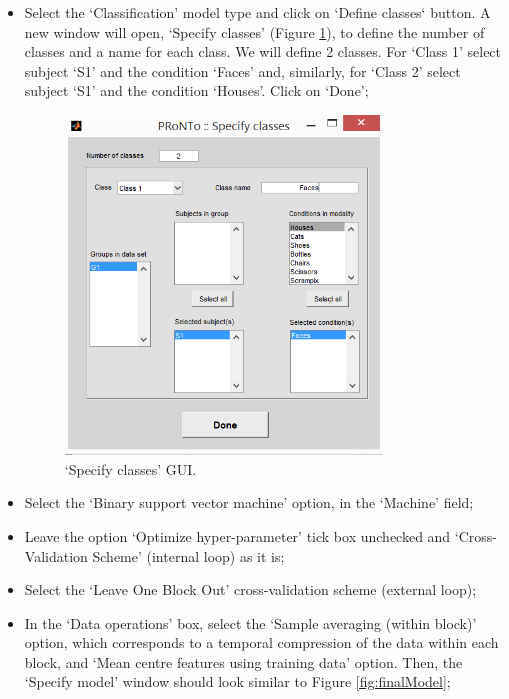 \begin{itemize}
	\item	Select the `Classification' model type and click on `Define classes` button. A new window will open, `Specify classes' (Figure \ref{fig:specifyClasses}), to define the number of classes and a name for each class. We will define 2 classes. For `Class 1' select subject `S1' and the condition `Faces' and, similarly, for `Class 2' select subject `S1' and the condition `Houses'. Click on `Done';
	
\begin{figure}[!h]
	\centering
		\includegraphics[height=9cm]{images/Tutorial/classification/specifyClasses.png}
	\caption{`Specify classes' GUI.}
	\label{fig:specifyClasses}
\end{figure}
	
	\item Select the `Binary support vector machine' option, in the `Machine' field;
	
	\item Leave the option `Optimize hyper-parameter' tick box unchecked and `Cross-Validation Scheme' (internal loop) as it is; 
	
	\item Select the `Leave One Block Out' cross-validation scheme (external loop);
	
	\item In the `Data operations' box, select the `Sample averaging (within block)' option, which corresponds to a temporal compression of the data within each block, and `Mean centre features using training data' option. Then, the `Specify model' window should look similar to Figure \ref{fig:finalModel};
	

\end{itemize}
